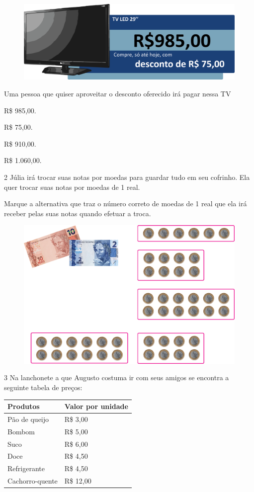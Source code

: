 \begin{figure}[htpb!]
\centering
\includegraphics[width=\textwidth]{./media/image73.png}
\end{figure}

Uma pessoa que quiser aproveitar o desconto oferecido irá pagar nessa TV

\begin{escolha}
\item
  R\$ 985,00.
\item
  R\$ 75,00.
\item
  R\$ 910,00.
\item
  R\$ 1.060,00.
\end{escolha}

\num{2} Júlia irá trocar suas notas por moedas para guardar tudo em seu
cofrinho. Ela quer trocar suas notas por moedas de 1 real.

\pagebreak

Marque a
alternativa que traz o número correto de moedas de 1 real que ela
irá receber pelas suas notas quando efetuar a troca.

\begin{figure}[htpb!]
\centering
\includegraphics[width=.65\textwidth]{./media/image74.png}
\end{figure}



\num{3} Na lanchonete a que Augusto costuma ir com seus amigos se encontra a
seguinte tabela de preços:

\begin{longtable}[]{@{}ll@{}}
\toprule
Produtos & Valor por unidade\tabularnewline
\midrule
\endhead
Pão de queijo & R\$ 3,00\tabularnewline
Bombom & R\$ 5,00\tabularnewline
Suco & R\$ 6,00\tabularnewline
Doce & R\$ 4,50\tabularnewline
Refrigerante & R\$ 4,50\tabularnewline
Cachorro-quente & R\$ 12,00\tabularnewline
\bottomrule
\end{longtable}

